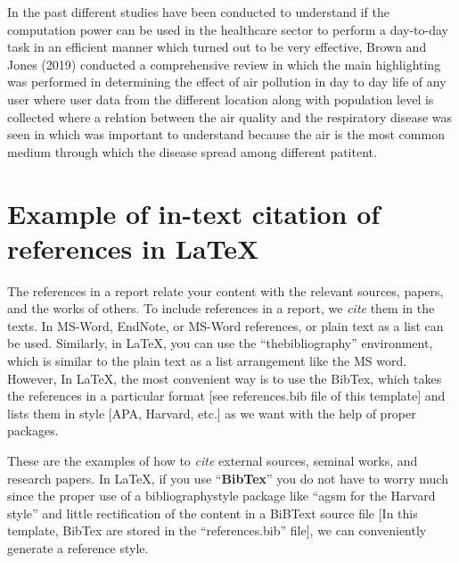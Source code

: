 \textbf{}

In the past different studies have been conducted to understand if the computation power can be used in the healthcare sector to perform a day-to-day task in an efficient manner which turned out to be very effective, Brown and Jones (2019) conducted a comprehensive review in which the main highlighting was performed in determining the effect of air pollution in day to day life of any user where user data from the different location along with population level is collected where a relation between the air quality and the respiratory disease was seen in which was important to understand because the air is the most common medium through which the disease spread among different patitent\cite{sacks2011particulate}. 


\section{Example of in-text citation of references in \LaTeX} 
The references in a report relate your content with the relevant sources, papers, and the works of others. To include references in a report, we \textit{cite} them in the texts. In MS-Word, EndNote, or MS-Word references, or plain text as a list can be used. Similarly, in \LaTeX, you can use the ``thebibliography'' environment, which is similar to the plain text as a list arrangement like the MS word. However, In \LaTeX, the most convenient way is to use the BibTex, which takes the references in a particular format [see references.bib file of this template] and lists them in style [APA, Harvard, etc.] as we want with the help of proper packages.    

These are the examples of how to \textit{cite} external sources, seminal works, and research papers. In \LaTeX, if you use ``\textbf{BibTex}'' you do not have to worry much since the proper use of a bibliographystyle package like ``agsm for the Harvard style'' and little rectification of the content in a BiBText source file [In this template, BibTex are stored in the ``references.bib'' file], we can conveniently generate  a reference style. 

